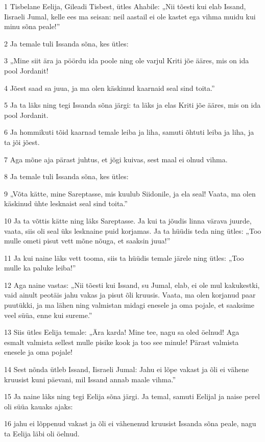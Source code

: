\par 1 Tisbelane Eelija, Gileadi Tisbest, ütles Ahabile: „Nii tõesti kui elab Issand, Iisraeli Jumal, kelle ees ma seisan: neil aastail ei ole kastet ega vihma muidu kui minu sõna peale!”
\par 2 Ja temale tuli Issanda sõna, kes ütles:
\par 3 „Mine siit ära ja pöördu ida poole ning ole varjul Kriti jõe ääres, mis on ida pool Jordanit!
\par 4 Jõest saad sa juua, ja ma olen käskinud kaarnaid seal sind toita.”
\par 5 Ja ta läks ning tegi Issanda sõna järgi: ta läks ja elas Kriti jõe ääres, mis on ida pool Jordanit.
\par 6 Ja hommikuti tõid kaarnad temale leiba ja liha, samuti õhtuti leiba ja liha, ja ta jõi jõest.
\par 7 Aga mõne aja pärast juhtus, et jõgi kuivas, sest maal ei olnud vihma.
\par 8 Ja temale tuli Issanda sõna, kes ütles:
\par 9 „Võta kätte, mine Sareptasse, mis kuulub Siidonile, ja ela seal! Vaata, ma olen käskinud ühte lesknaist seal sind toita.”
\par 10 Ja ta võttis kätte ning läks Sareptasse. Ja kui ta jõudis linna värava juurde, vaata, siis oli seal üks lesknaine puid korjamas. Ja ta hüüdis teda ning ütles: „Too mulle ometi pisut vett mõne nõuga, et saaksin juua!”
\par 11 Ja kui naine läks vett tooma, siis ta hüüdis temale järele ning ütles: „Too mulle ka paluke leiba!”
\par 12 Aga naine vastas: „Nii tõesti kui Issand, su Jumal, elab, ei ole mul kakukestki, vaid ainult peotäis jahu vakas ja pisut õli kruusis. Vaata, ma olen korjanud paar puutükki, ja ma lähen ning valmistan midagi enesele ja oma pojale, et saaksime veel süüa, enne kui sureme.”
\par 13 Siis ütles Eelija temale: „Ära karda! Mine tee, nagu sa oled öelnud! Aga esmalt valmista sellest mulle pisike kook ja too see minule! Pärast valmista enesele ja oma pojale!
\par 14 Sest nõnda ütleb Issand, Iisraeli Jumal: Jahu ei lõpe vakast ja õli ei vähene kruusist kuni päevani, mil Issand annab maale vihma.”
\par 15 Ja naine läks ning tegi Eelija sõna järgi. Ja temal, samuti Eelijal ja naise perel oli süüa kauaks ajaks:
\par 16 jahu ei lõppenud vakast ja õli ei vähenenud kruusist Issanda sõna peale, nagu ta Eelija läbi oli öelnud.
